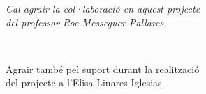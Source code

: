 \cleardoublepage


%  
%  

\setlength{\descriptionwidth}{0.8\linewidth}
\printglossary

\pagestyle{empty}
\cleardoublepage
\vspace*{5cm}
\begin{flushright}
\it
Cal agrair la col·laboració en aquest projecte \\
del professor Roc Messeguer Pallares.

\

Agrair també pel suport durant la realització \\
del projecte a l'Elisa Linares Iglesias.
\end{flushright}
\cleardoublepage
